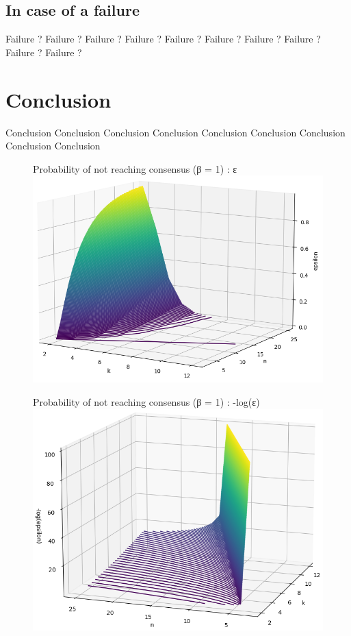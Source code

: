 \documentclass[11pt, twocolumn]{article}
\begin{document}
\subsection{In case of a failure}

Failure ?
Failure ?
Failure ?
Failure ?
Failure ?
Failure ?
Failure ?
Failure ?
Failure ?
Failure ?

\section{Conclusion}

Conclusion
Conclusion
Conclusion
Conclusion
Conclusion
Conclusion
Conclusion
Conclusion
Conclusion

\onecolumn



\begin{appendices}
    \label{Appendices}
    \begin{figure}
        Probability of not reaching consensus (β = 1) : ε 
        \centering
        \includegraphics[width=16.5cm]{images/smallNoConsensusBetaOne.png}
    \end{figure}
    \begin{figure}
        Probability of not reaching consensus (β = 1) : -log(ε) 
        \centering
        \includegraphics[width=16.5cm]{images/smalllogNoConsensusBetaOne.png}

\end{figure}
\end{appendices}
\end{document}
